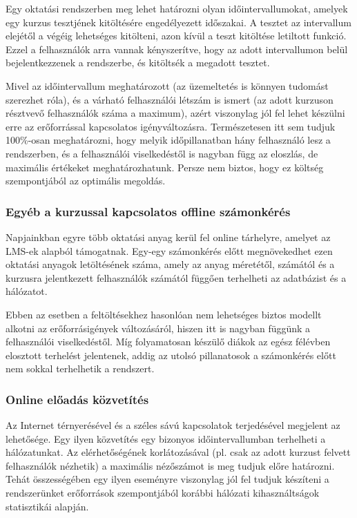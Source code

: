 Egy oktatási rendszerben meg lehet határozni olyan időintervallumokat, amelyek egy kurzus tesztjének kitöltésére engedélyezett időszakai. A tesztet az intervallum elejétől a végéig lehetséges kitölteni, azon kívül a teszt kitöltése letiltott funkció. Ezzel a felhasználók arra vannak kényszerítve, hogy az adott intervallumon belül bejelentkezzenek a rendszerbe, és kitöltsék a megadott tesztet.

Mivel az időintervallum meghatározott (az üzemeltetés is könnyen tudomást szerezhet róla), és a várható felhasználói létszám is ismert (az adott kurzuson résztvevő felhasználók száma a maximum), azért viszonylag jól fel lehet készülni erre az erőforrással kapcsolatos igényváltozásra. Természetesen itt sem tudjuk 100\%-osan meghatározni, hogy melyik időpillanatban hány felhasználó lesz a rendszerben, és a felhasználói viselkedéstől is nagyban függ az eloszlás, de maximális értékeket meghatározhatunk. Persze nem biztos, hogy ez költség szempontjából az optimális megoldás.

\subsubsection{Egyéb a kurzussal kapcsolatos offline számonkérés}

Napjainkban egyre több oktatási anyag kerül fel online tárhelyre, amelyet az LMS-ek alapból támogatnak. Egy-egy számonkérés előtt megnövekedhet ezen oktatási anyagok letöltésének száma, amely az anyag méretétől, számától és a kurzusra jelentkezett felhasználók számától függően terhelheti az adatbázist és a hálózatot.

Ebben az esetben a feltöltésekhez hasonlóan nem lehetséges biztos modellt alkotni az erőforrásigények változásáról, hiszen itt is nagyban függünk a felhasználói viselkedéstől. Míg folyamatosan készülő diákok az egész félévben elosztott terhelést jelentenek, addig az utolsó pillanatosok a számonkérés előtt nem sokkal terhelhetik a rendszert. 

\subsubsection{Online előadás közvetítés}

Az Internet térnyerésével és a széles sávú kapcsolatok terjedésével megjelent az  lehetősége. Egy ilyen közvetítés egy bizonyos időintervallumban terhelheti a hálózatunkat. Az elérhetőségének korlátozásával (pl. csak az adott kurzust felvett felhasználók nézhetik) a maximális nézőszámot is meg tudjuk előre határozni. Tehát összességében egy ilyen eseményre viszonylag jól fel tudjuk készíteni a rendszerünket erőforrások szempontjából korábbi hálózati kihasználtságok statisztikái alapján.  

